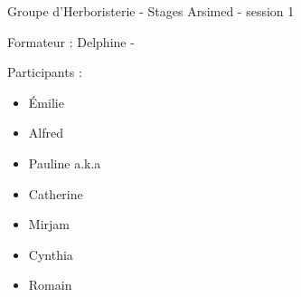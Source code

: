 Groupe d'Herboristerie - Stages Arsimed - session 1

Formateur : Delphine - 

Participants : 
\begin{itemize}[label = \faPen]
    \item \'Emilie
    \item Alfred
    \item Pauline a.k.a 
    \item Catherine
    \item Mirjam
    \item Cynthia
    \item Romain
\end{itemize}